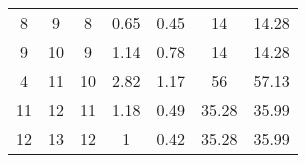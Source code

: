 \begin{table}[]
\begin{tabular}{@{}ccccccc@{}}
8                                                            & 9                                                              & 8                                                     & 0.65                                                                           & 0.45                                                                           & 14                                                                                  & 14.28                                                                                 \\
9                                                            & 10                                                             & 9                                                     & 1.14                                                                           & 0.78                                                                           & 14                                                                                  & 14.28                                                                                 \\
4                                                            & 11                                                             & 10                                                    & 2.82                                                                           & 1.17                                                                           & 56                                                                                  & 57.13                                                                                 \\
11                                                           & 12                                                             & 11                                                    & 1.18                                                                           & 0.49                                                                           & 35.28                                                                               & 35.99                                                                                 \\
12                                                           & 13                                                             & 12                                                    & 1                                                                              & 0.42                                                                           & 35.28                                                                               & 35.99                                                                                 \\

\end{tabular}
\end{table}
